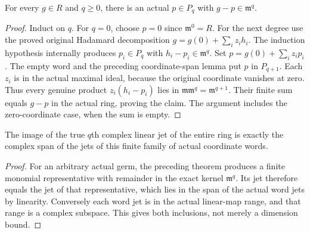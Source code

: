 \begin{theorem}
\label{hir:actual-whole-germ-finite-monomial-representative}
\leanok
{}
For every $g\in R$ and $q\ge0$, there is an actual $p\in P_q$ with
$g-p\in\mathfrak m^q$.
\end{theorem}
\begin{proof}
Induct on $q$. For $q=0$, choose $p=0$ since $\mathfrak m^0=R$.
For the next degree use the proved original Hadamard decomposition
$g=g(0)+\sum_i z_i h_i$. The induction hypothesis internally produces
$p_i\in P_q$ with $h_i-p_i\in\mathfrak m^q$. Set
$p=g(0)+\sum_i z_i p_i$. The empty word and the preceding coordinate-span
lemma put $p$ in $P_{q+1}$. Each $z_i$ is in the actual maximal ideal,
because the original coordinate vanishes at zero. Thus every genuine
product $z_i(h_i-p_i)$ lies in $\mathfrak m\mathfrak m^q=\mathfrak m^{q+1}$.
Their finite sum equals $g-p$ in the actual ring, proving the claim.
The argument includes the zero-coordinate case, when the sum is empty.
\end{proof}

\begin{theorem}
\label{hir:actual-whole-jet-monomial-span}
\leanok
{}
The image of the true $q$th complex linear jet of the entire ring is exactly
the complex span of the jets of this finite family of actual coordinate words.
\end{theorem}
\begin{proof}
For an arbitrary actual germ, the preceding theorem produces a finite
monomial representative with remainder in the exact kernel $\mathfrak m^q$.
Its jet therefore equals the jet of that representative, which lies in the
span of the actual word jets by linearity. Conversely each word jet is in
the actual linear-map range, and that range is a complex subspace. This gives
both inclusions, not merely a dimension bound.
\end{proof}

